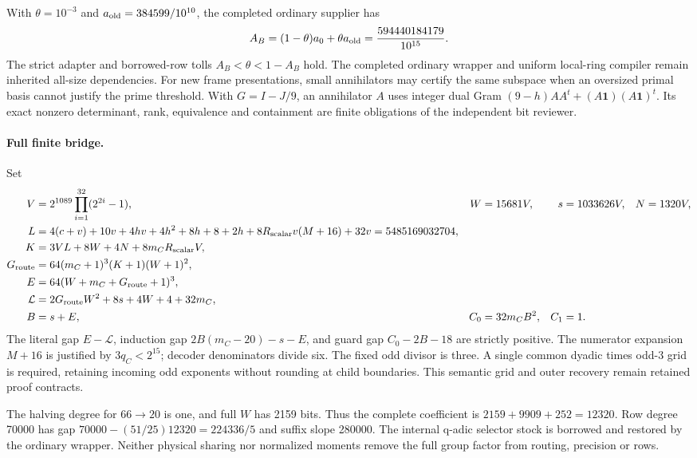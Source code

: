 \documentclass[11pt]{article}
\begin{document}
With $\theta=10^{-3}$ and $a_{\rm old}=384599/10^{10}$, the completed
ordinary supplier has
\[
 A_B=(1-\theta)a_0+\theta a_{\rm old}
 =\frac{594440184179}{10^{15}}.
\]
The strict adapter and borrowed-row tolls $A_B<\theta<1-A_B$ hold.
The completed ordinary wrapper and uniform local-ring compiler remain
inherited all-size dependencies. For new frame presentations, small
annihilators may certify the same subspace when an oversized primal
basis cannot justify the prime threshold. With $G=I-J/9$, an annihilator
$A$ uses integer dual Gram
$(9-h)AA^t+(A\mathbf1)(A\mathbf1)^t$.
Its exact nonzero determinant, rank, equivalence and containment are
finite obligations of the independent bit reviewer.

\paragraph{Full finite bridge.}
Set
\begin{align*}
 V&=2^{1089}\prod_{i=1}^{32}(2^{2i}-1),&
 W&=15681V,&s&=1033626V,&N&=1320V,\\
 L&=4(c+v)+10v+4hv+4h^2+8h+8+2h
       +8R_{\rm scalar}v(M+16)+32v=5485169032704,\\
 K&=3VL+8W+4N+8m_CR_{\rm scalar}V,\\
 G_{\rm route}&=64(m_C+1)^3(K+1)(W+1)^2,\\
 E&=64(W+m_C+G_{\rm route}+1)^3,\\
 \mathcal L&=2G_{\rm route}W^2+8s+4W+4+32m_C,\\
 B&=s+E,&C_0&=32m_CB^2,&C_1&=1.
\end{align*}
The literal gap $E-\mathcal L$, induction gap
$2B(m_C-20)-s-E$, and guard gap $C_0-2B-18$ are strictly positive.
The numerator expansion $M+16$ is justified by $3q_C<2^{15}$;
decoder denominators divide six. The fixed odd divisor is three.
A single common dyadic times odd-3 grid is required, retaining incoming
odd exponents without rounding at child boundaries. This semantic grid
and outer recovery remain retained proof contracts.

The halving degree for $66\to20$ is one, and full $W$ has 2159 bits.
Thus the complete coefficient is $2159+9909+252=12320$. Row degree
70000 has gap $70000-(51/25)12320=224336/5$ and suffix slope 280000.
The internal q-adic selector stock is borrowed and restored by the
ordinary wrapper. Neither physical sharing nor normalized moments
remove the full group factor from routing, precision or rows.
\end{document}
